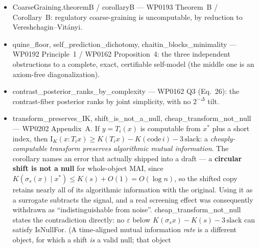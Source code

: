 \documentclass[11pt,a4paper]{article}
\newcommand{\lean}[1]{{\ttfamily\small
  \let\leanunderscore\_\def\_{\leanunderscore\allowbreak}#1}}
\newcommand{\Ik}{\mathrm{I}_K}
\begin{document}
\begin{itemize}[leftmargin=1.4em,itemsep=1pt]
selected program's posterior with $2^{-\delta}\mathrm{post}(e,x)$ when its
length is $K(e)+\delta$ and its evidence denominator agrees with the frame.
\lean{specified\_weight\_coding\_bounds} retains the actual program length
and both coding constants. \lean{sharp\_art\_specified} gives the sharp
regulator bound with explicit prefactor $(1/c_1)2^{c_0-\delta}$;
\lean{sharp\_art\_uniform} chooses one upper prefactor before quantifying
over candidates, using a common lower bound on $\delta$.
\lean{ARTExactForm.conditional\_art\_specified} converts the exponent by
the two-sided chain rule while retaining $s=\mathrm{slack}$ in that
exponent. The code assignment, prefix-machine interpretation and uniform
program costs remain separate obligations; the abstract weights alone
are not a normalized posterior over explanations.
\item \lean{CoarseGraining.theoremB} / \lean{corollaryB} --- WP0193 Theorem~B / Corollary~B:
regulatory coarse-graining is uncomputable, by reduction to Vereshchagin--Vitányi.
\item \lean{quine\_floor}, \lean{self\_prediction\_dichotomy}, \lean{chaitin\_blocks\_minimality}
--- WP0192 Principle~1 / WP0162 Proposition~4: the three independent obstructions to a complete,
exact, certifiable self-model (the middle one is an axiom-free diagonalization).
\item \lean{contrast\_posterior\_ranks\_by\_complexity} --- WP0162 Q3 (Eq.~26): the contrast-fiber
posterior ranks by joint simplicity, with no $2^{-\Delta}$ tilt.
\item \lean{transform\_preserves\_IK}, \lean{shift\_is\_not\_a\_null},
\lean{cheap\_transform\_not\_null} --- WP0202 Appendix~A. If $y=T_i(x)$ is computable from $x^\ast$
plus a short index, then $\Ik(x:T_i x)\ge K(T_i x)-K(\mathrm{code}\,i)-3\,\mathrm{slack}$: a
\emph{cheaply-computable transform preserves algorithmic mutual information}. The corollary names an
error that actually shipped into a draft --- a \textbf{circular shift is not a null} for whole-object
MAI, since $K(\sigma_s(x)\mid x^\ast)\le K(s)+O(1)=O(\log n)$, so the shifted copy retains nearly all
of its algorithmic information with the original. Using it as a surrogate subtracts the signal, and a
real screening effect was consequently withdrawn as ``indistinguishable from noise''.
\lean{cheap\_transform\_not\_null} states the contradiction directly: no $\varepsilon$ below
$K(\sigma_s x)-K(s)-3\,\mathrm{slack}$ can satisfy \lean{IsNullFor}. (A time-aligned mutual
information \emph{rate} is a different object, for which a shift \emph{is} a valid null; that object

\end{itemize}
\end{document}
